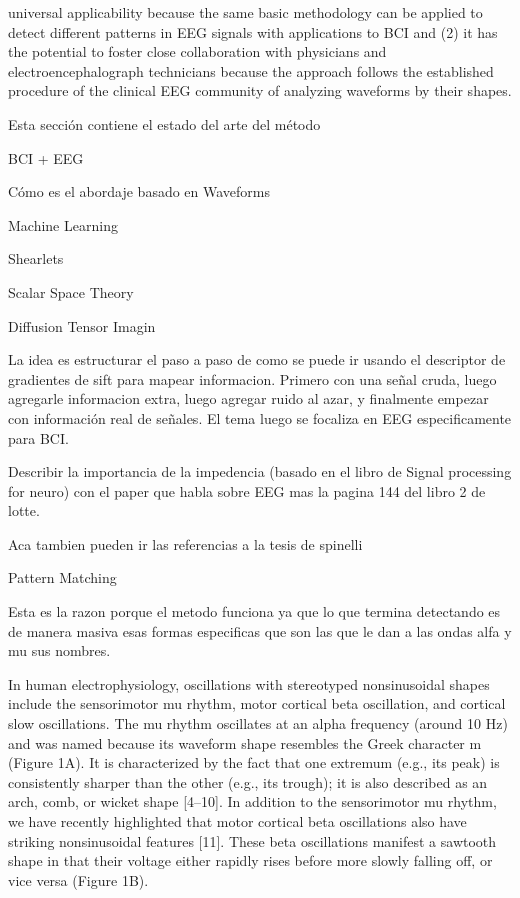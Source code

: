 universal applicability because the same basic methodology can be applied to detect different patterns in EEG signals with applications to BCI and (2) it has the potential to foster close collaboration with physicians and electroencephalograph technicians because the approach follows the established procedure of the clinical EEG community of analyzing waveforms by their shapes.

Esta sección contiene el estado del arte del método

BCI + EEG

Cómo es el abordaje basado en Waveforms

Machine Learning

Shearlets

Scalar Space Theory


Diffusion Tensor Imagin

La idea es estructurar el paso a paso de como se puede ir usando el descriptor de gradientes de sift para 
mapear informacion.  Primero con una señal cruda, luego agregarle informacion extra, luego agregar ruido al azar, y finalmente empezar con información real de señales.  El tema luego se focaliza en EEG especificamente para BCI.


Describir la importancia de la impedencia (basado en el libro de Signal processing for neuro) con el paper que habla sobre EEG mas la pagina 144 del libro 2 de lotte.

Aca tambien pueden ir las referencias a la tesis de spinelli

Pattern Matching


Esta es la razon porque el metodo funciona ya que lo que termina detectando es de manera masiva
esas formas especificas que son las que le dan a las ondas alfa y mu sus nombres.

In human electrophysiology, oscillations with stereotyped nonsinusoidal shapes include the
sensorimotor mu rhythm, motor cortical beta oscillation, and cortical slow oscillations. The mu
rhythm oscillates at an alpha frequency (around 10 Hz) and was named because its waveform
shape resembles the Greek character m (Figure 1A). It is characterized by the fact that one
extremum (e.g., its peak) is consistently sharper than the other (e.g., its trough); it is also
described as an arch, comb, or wicket shape [4–10].
In addition to the sensorimotor mu rhythm, we have recently highlighted that motor cortical beta
oscillations also have striking nonsinusoidal features [11]. These beta oscillations manifest a
sawtooth shape in that their voltage either rapidly rises before more slowly falling off, or vice
versa (Figure 1B).


